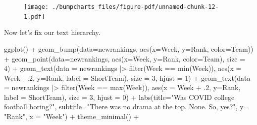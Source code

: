 \documentclass[
  letterpaper,
  DIV=11,
  numbers=noendperiod]{scrreprt}
\newenvironment{Shaded}{\begin{snugshade}}{\end{snugshade}}
\newcommand{\AttributeTok}[1]{\textcolor[rgb]{0.40,0.45,0.13}{#1}}
\newcommand{\DecValTok}[1]{\textcolor[rgb]{0.68,0.00,0.00}{#1}}
\newcommand{\FunctionTok}[1]{\textcolor[rgb]{0.28,0.35,0.67}{#1}}
\newcommand{\NormalTok}[1]{\textcolor[rgb]{0.00,0.23,0.31}{#1}}
\newcommand{\SpecialCharTok}[1]{\textcolor[rgb]{0.37,0.37,0.37}{#1}}
\newcommand{\StringTok}[1]{\textcolor[rgb]{0.13,0.47,0.30}{#1}}
\begin{document}
\begin{figure}[H]

{\centering \texttt{[image: ./bumpcharts\_files/figure-pdf/unnamed-chunk-12-1.pdf]}

}

\end{figure}

Now let's fix our text hierarchy.

\begin{Shaded}
\begin{Highlighting}[]
\FunctionTok{ggplot}\NormalTok{() }\SpecialCharTok{+} 
  \FunctionTok{geom\_bump}\NormalTok{(}\AttributeTok{data=}\NormalTok{newrankings, }\FunctionTok{aes}\NormalTok{(}\AttributeTok{x=}\NormalTok{Week, }\AttributeTok{y=}\NormalTok{Rank, }\AttributeTok{color=}\NormalTok{Team)) }\SpecialCharTok{+} 
  \FunctionTok{geom\_point}\NormalTok{(}\AttributeTok{data=}\NormalTok{newrankings, }\FunctionTok{aes}\NormalTok{(}\AttributeTok{x=}\NormalTok{Week, }\AttributeTok{y=}\NormalTok{Rank, }\AttributeTok{color=}\NormalTok{Team), }\AttributeTok{size =} \DecValTok{4}\NormalTok{) }\SpecialCharTok{+}   
  \FunctionTok{geom\_text}\NormalTok{(}\AttributeTok{data =}\NormalTok{ newrankings }\SpecialCharTok{|\textgreater{}} \FunctionTok{filter}\NormalTok{(Week }\SpecialCharTok{==} \FunctionTok{min}\NormalTok{(Week)), }\FunctionTok{aes}\NormalTok{(}\AttributeTok{x =}\NormalTok{ Week }\SpecialCharTok{{-}}\NormalTok{ .}\DecValTok{2}\NormalTok{, }\AttributeTok{y=}\NormalTok{Rank, }\AttributeTok{label =}\NormalTok{ ShortTeam), }\AttributeTok{size =} \DecValTok{3}\NormalTok{, }\AttributeTok{hjust =} \DecValTok{1}\NormalTok{) }\SpecialCharTok{+}
  \FunctionTok{geom\_text}\NormalTok{(}\AttributeTok{data =}\NormalTok{ newrankings }\SpecialCharTok{|\textgreater{}} \FunctionTok{filter}\NormalTok{(Week }\SpecialCharTok{==} \FunctionTok{max}\NormalTok{(Week)), }\FunctionTok{aes}\NormalTok{(}\AttributeTok{x =}\NormalTok{ Week }\SpecialCharTok{+}\NormalTok{ .}\DecValTok{2}\NormalTok{, }\AttributeTok{y=}\NormalTok{Rank, }\AttributeTok{label =}\NormalTok{ ShortTeam), }\AttributeTok{size =} \DecValTok{3}\NormalTok{, }\AttributeTok{hjust =} \DecValTok{0}\NormalTok{) }\SpecialCharTok{+}
  \FunctionTok{labs}\NormalTok{(}\AttributeTok{title=}\StringTok{"Was COVID college football boring?"}\NormalTok{, }\AttributeTok{subtitle=}\StringTok{"There was no drama at the top. None. So, yes?"}\NormalTok{, }\AttributeTok{y=} \StringTok{"Rank"}\NormalTok{, }\AttributeTok{x =} \StringTok{"Week"}\NormalTok{) }\SpecialCharTok{+}
  \FunctionTok{theme\_minimal}\NormalTok{() }\SpecialCharTok{+}

\end{Highlighting}
\end{Shaded}
\end{document}
